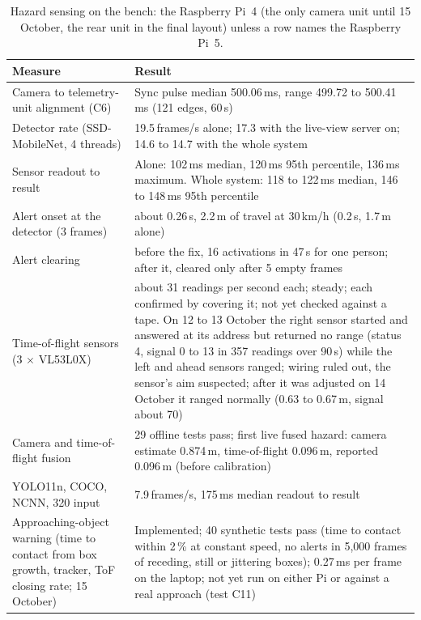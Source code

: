 \begin{table}[htbp]
\centering
\caption[Hazard sensing on the bench: the Raspberry Pi~4 (the only camera unit until 15 October, the rear unit in the final layout) unless a row names the Raspberry Pi~5]{Hazard sensing on the bench: the Raspberry Pi~4 (the only camera unit until 15 October, the rear unit in the final layout) unless a row names the Raspberry Pi~5.}
\label{tab:res-camera}
\begin{tabular}{|p{6.2cm}|p{7.6cm}|}
\hline
\textbf{Measure} & \textbf{Result} \\ \hline
Camera to telemetry-unit alignment (C6) & Sync pulse median 500.06\,ms, range 499.72 to 500.41\,ms (121 edges, 60\,s) \\ \hline
Detector rate (SSD-MobileNet, 4 threads) & 19.5\,frames/s alone; 17.3 with the live-view server on; 14.6 to 14.7 with the whole system \\ \hline
Sensor readout to result & Alone: 102\,ms median, 120\,ms 95th percentile, 136\,ms maximum. Whole system: 118 to 122\,ms median, 146 to 148\,ms 95th percentile \\ \hline
Alert onset at the detector (3 frames) & about 0.26\,s, 2.2\,m of travel at 30\,km/h (0.2\,s, 1.7\,m alone) \\ \hline
Alert clearing & before the fix, 16 activations in 47\,s for one person; after it, cleared only after 5 empty frames \\ \hline
Time-of-flight sensors (3 $\times$ VL53L0X) & about 31 readings per second each; steady; each confirmed by covering it; not yet checked against a tape. On 12 to 13 October the right sensor started and answered at its address but returned no range (status 4, signal 0 to 13 in 357 readings over 90\,s) while the left and ahead sensors ranged; wiring ruled out, the sensor's aim suspected; after it was adjusted on 14 October it ranged normally (0.63 to 0.67\,m, signal about 70) \\ \hline
Camera and time-of-flight fusion & 29 offline tests pass; first live fused hazard: camera estimate 0.874\,m, time-of-flight 0.096\,m, reported 0.096\,m (before calibration) \\ \hline
YOLO11n, COCO, NCNN, 320 input & 7.9\,frames/s, 175\,ms median readout to result \\ \hline
Approaching-object warning (time to contact from box growth, tracker, ToF closing rate; 15 October) & Implemented; 40 synthetic tests pass (time to contact within 2\,\% at constant speed, no alerts in 5,000 frames of receding, still or jittering boxes); 0.27\,ms per frame on the laptop; not yet run on either Pi or against a real approach (test C11) \\ \hline

\end{tabular}
\end{table}
